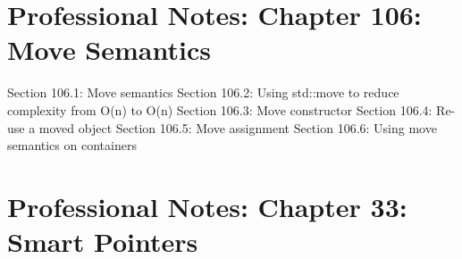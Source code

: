 \hypertarget{professional-notes-chapter-106-move-semantics}{%
\chapter{Professional Notes: Chapter 106: Move
Semantics}\label{professional-notes-chapter-106-move-semantics}}

Section 106.1: Move semantics Section 106.2: Using std::move to reduce
complexity from O(n) to O(n) Section 106.3: Move constructor Section
106.4: Re-use a moved object Section 106.5: Move assignment Section
106.6: Using move semantics on containers

\hypertarget{professional-notes-chapter-33-smart-pointers-1}{%
\chapter{Professional Notes: Chapter 33: Smart
Pointers}\label{professional-notes-chapter-33-smart-pointers-1}}

